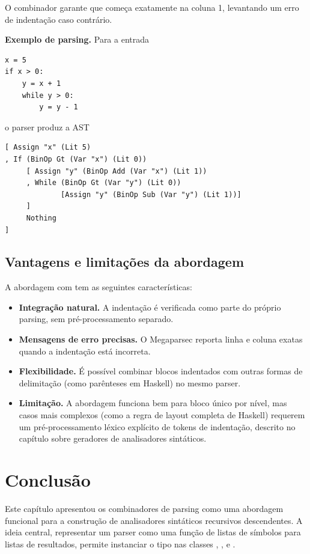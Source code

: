 O combinador  garante que 
começa exatamente na coluna 1, levantando um erro de indentação caso
contrário.

\textbf{Exemplo de parsing.} Para a entrada

\begin{verbatim}
x = 5
if x > 0:
    y = x + 1
    while y > 0:
        y = y - 1
\end{verbatim}

\noindent o parser produz a AST

\begin{verbatim}
[ Assign "x" (Lit 5)
, If (BinOp Gt (Var "x") (Lit 0))
     [ Assign "y" (BinOp Add (Var "x") (Lit 1))
     , While (BinOp Gt (Var "y") (Lit 0))
             [Assign "y" (BinOp Sub (Var "y") (Lit 1))]
     ]
     Nothing
]
\end{verbatim}

\subsection{Vantagens e limitações da abordagem}

A abordagem com  tem as seguintes
características:

\begin{itemize}
  \item \textbf{Integração natural.} A indentação é verificada como
    parte do próprio parsing, sem pré-processamento separado.
  \item \textbf{Mensagens de erro precisas.} O Megaparsec reporta linha
    e coluna exatas quando a indentação está incorreta.
  \item \textbf{Flexibilidade.} É possível combinar blocos indentados
    com outras formas de delimitação (como parênteses em Haskell) no
    mesmo parser.
  \item \textbf{Limitação.} A abordagem funciona bem para bloco único
    por nível, mas casos mais complexos (como a regra de layout
    completa de Haskell) requerem um pré-processamento léxico explícito
    de tokens de indentação, descrito no capítulo sobre geradores de
    analisadores sintáticos.
\end{itemize}

\section{Conclusão}

Este capítulo apresentou os combinadores de parsing como uma
abordagem funcional para a construção de analisadores sintáticos
recursivos descendentes. A ideia central, representar um parser
como uma função de listas de símbolos para listas de resultados,
permite instanciar o tipo  nas
classes ,
,
 e .

